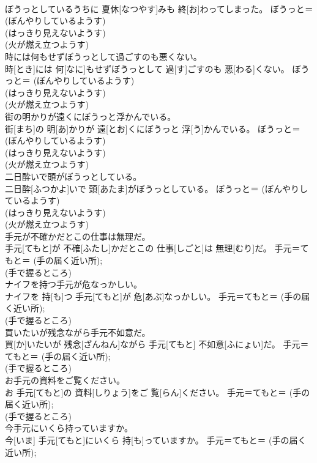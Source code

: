 \documentclass[8pt]{extreport}
\begin{document}
\begin{CJK}{UTF8}{min}
{\\	ぼうっとしているうちに 夏休[なつやす]みも 終[お]わってしまった。	ぼうっと＝ (ぼんやりしているようす) 
\\	(はっきり見えないようす) 
\\	(火が燃え立つようす) 
\\	時には何もせずぼうっとして過ごすのも悪くない。	
\\	時[とき]には 何[なに]もせずぼうっとして 過[す]ごすのも 悪[わる]くない。	ぼうっと＝ (ぼんやりしているようす) 
\\	(はっきり見えないようす) 
\\	(火が燃え立つようす) 
\\	街の明かりが遠くにぼうっと浮かんでいる。	
\\	街[まち]の 明[あ]かりが 遠[とお]くにぼうっと 浮[う]かんでいる。	ぼうっと＝ (ぼんやりしているようす) 
\\	(はっきり見えないようす) 
\\	(火が燃え立つようす) 
\\	二日酔いで頭がぼうっとしている。	
\\	二日酔[ふつかよ]いで 頭[あたま]がぼうっとしている。	ぼうっと＝ (ぼんやりしているようす) 
\\	(はっきり見えないようす) 
\\	(火が燃え立つようす) 
\\	手元が不確かだとこの仕事は無理だ。	
\\	手元[てもと]が 不確[ふたし]かだとこの 仕事[しごと]は 無理[むり]だ。	手元＝てもと＝ (手の届く近い所); 
\\	(手で握るところ) 
\\	ナイフを持つ手元が危なっかしい。	
\\	ナイフを 持[も]つ 手元[てもと]が 危[あぶ]なっかしい。	手元＝てもと＝ (手の届く近い所); 
\\	(手で握るところ) 
\\	買いたいが残念ながら手元不如意だ。	
\\	買[か]いたいが 残念[ざんねん]ながら 手元[てもと] 不如意[ふにょい]だ。	手元＝てもと＝ (手の届く近い所); 
\\	(手で握るところ) 
\\	お手元の資料をご覧ください。	
\\	お 手元[てもと]の 資料[しりょう]をご 覧[らん]ください。	手元＝てもと＝ (手の届く近い所); 
\\	(手で握るところ) 
\\	今手元にいくら持っていますか。	
\\	今[いま] 手元[てもと]にいくら 持[も]っていますか。	手元＝てもと＝ (手の届く近い所); 
}
\end{CJK}
\end{document}
